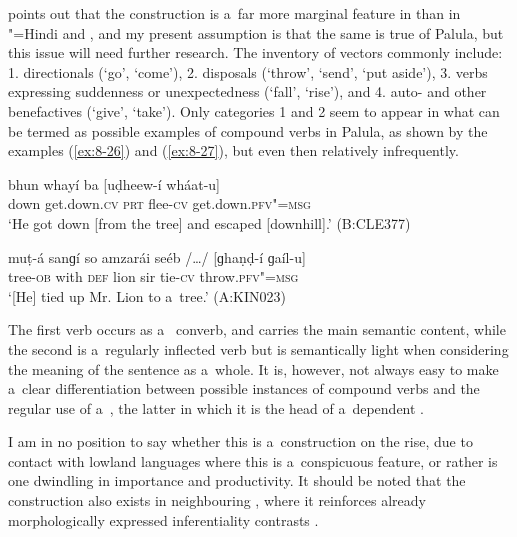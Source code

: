 \citet[20]{schmidt2004b} points out that the  construction is a~far more marginal feature in   than in "=Hindi and , and my present assumption is that the same is true of Palula, but this issue will need further research. The inventory of vectors commonly include: 1. directionals (`go', `come'), 2. disposals (`throw', `send', `put aside'), 3. verbs expressing suddenness or unexpectedness (`fall', `rise'), and 4. auto- and other benefactives (`give', `take'). Only categories 1 and 2 seem to appear in what can be termed as possible examples of compound verbs in Palula, as shown by the examples (\ref{ex:8-26}) and (\ref{ex:8-27}), but even then relatively infrequently. 

\begin{exe}
\ex
\label{ex:8-26}
\gll bhun whayí ba [uḍheew-í wháat-u] \\
down get.down.\textsc{cv} \textsc{prt} flee-\textsc{cv} get.down.\textsc{pfv"=msg} \\
\glt `He got down [from the tree] and escaped [downhill].' (B:CLE377)
\end{exe}
\begin{exe}
\ex
\label{ex:8-27}
\gll muṭ-á sanɡí so amzarái seéb /{\ldots}/ [ɡhaṇḍ-í ɡaíl-u] \\
tree-\textsc{ob} with \textsc{def} lion sir {} tie-\textsc{cv} throw.\textsc{pfv"=msg} \\
\glt `[He] tied up Mr. Lion to a~tree.' (A:KIN023)
\end{exe}

The first verb occurs as a~ converb, and carries the main semantic content, while the second is a~regularly inflected  verb but is semantically light when considering the meaning of the sentence as a~whole. It is, however, not always easy to make a~clear differentiation between possible instances of compound verbs and the regular use of a~, the latter in which it is the head of a~dependent . 



I am in no position to say whether this is a~construction on the rise, due to contact with lowland languages where this is a~conspicuous feature, or rather is one dwindling in importance and productivity. It should be noted that the construction also exists in neighbouring , where it reinforces already morphologically expressed inferentiality contrasts \citep[1--4]{bashir1993}.
